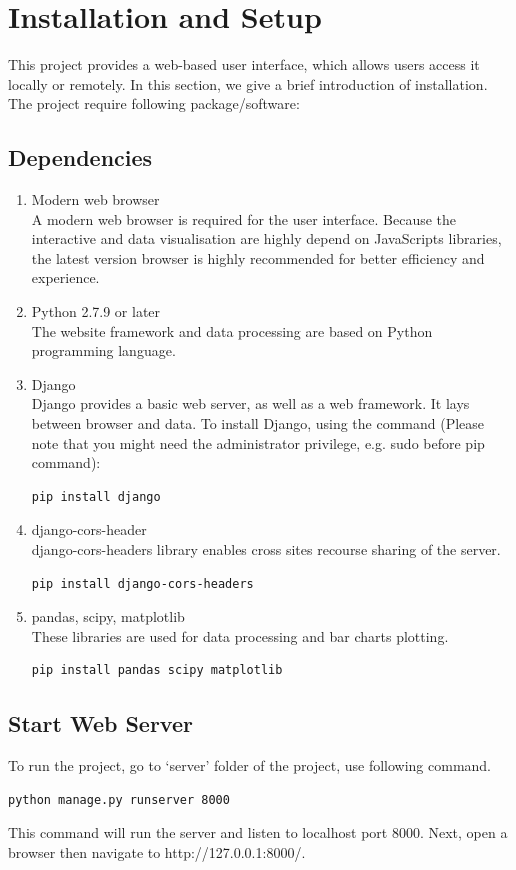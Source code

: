 \documentclass[11pt,letter]{article}
\begin{document}
\section {Installation and Setup}
This project provides a web-based user interface, which allows users access it locally or remotely. In this section, we give a brief introduction of installation. \\
The project require following package/software:
\subsection {Dependencies}
\begin{enumerate}
\item Modern web browser\\
A modern web browser is required for the user interface. Because the interactive and data visualisation are highly depend on JavaScripts libraries, the latest version browser is highly recommended for better efficiency and experience.
\item Python 2.7.9 or later\\
The website framework and data processing are based on Python programming language.
\item Django\\
Django provides a basic web server, as well as a web framework. It lays between browser and data. To install Django, using the command (Please note that you might need the administrator privilege, e.g. sudo before pip command):
\lstset{language=bash}
\begin{lstlisting}[frame=single]
pip install django
\end{lstlisting}
\item django-cors-header\\
django-cors-headers library enables cross sites recourse sharing of the server.
\lstset{language=bash}
\begin{lstlisting}[frame=single]
pip install django-cors-headers
\end{lstlisting}
\item pandas, scipy, matplotlib\\
These libraries are used for data processing and bar charts plotting.
\lstset{language=bash}
\begin{lstlisting}[frame=single]
pip install pandas scipy matplotlib
\end{lstlisting}
\end{enumerate}
\subsection {Start Web Server}
To run the project, go to ‘server’ folder of the project, use following command.
\lstset{language=bash}
\begin{lstlisting}[frame=single]
python manage.py runserver 8000
\end{lstlisting}
This command will run the server and listen to localhost port 8000. Next, open a browser then navigate to http://127.0.0.1:8000/.
\end{document}
